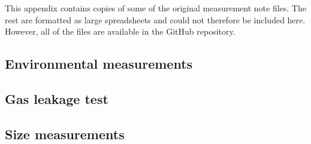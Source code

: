 \documentclass[a4paper]{article}
\begin{document}
\begin{appendices}
This appendix contains copies of some of the original measurement note files.
The rest are formatted as large spreadsheets and could not therefore be included here.
However, all of the files are available in the GitHub repository.
\cite{repo}

\subsection{Environmental measurements}


\subsection{Gas leakage test}


\subsection{Size measurements}
{

}


\end{appendices}


\clearpage
\printbibliography
\end{document}
